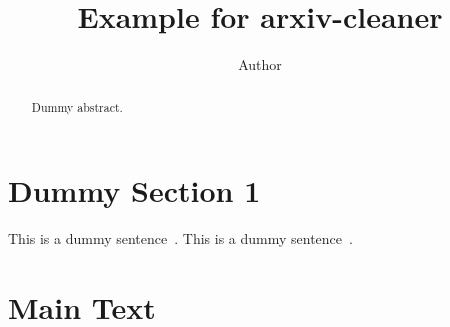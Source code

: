 \documentclass[twocolumn]{article}
\title{Example for arxiv-cleaner}
\author{Author}
\begin{document}
\maketitle

\begin{abstract}
Dummy abstract.
\end{abstract}

\section{Dummy Section 1}
\label{sec:dummy1}

This is a dummy sentence~\cite{Authors14}. This is a dummy sentence~\cite{Authors14b}.
 \section{Main Text}
\label{sec:main}
\end{document}
